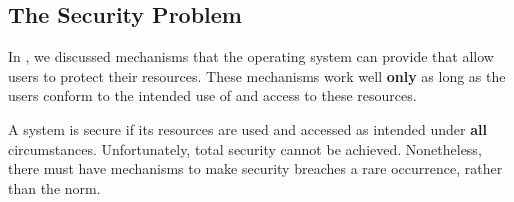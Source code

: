 \subsection{The Security Problem}\label{subsec:Security_Problem}
In , we discussed mechanisms that the operating system can provide that allow users to protect their resources.
These mechanisms work well \textbf{only} as long as the users conform to the intended use of and access to these resources.

A system is secure if its resources are used and accessed as intended under \textbf{all} circumstances.
Unfortunately, total security cannot be achieved.
Nonetheless, there must have mechanisms to make security breaches a rare occurrence, rather than the norm.


